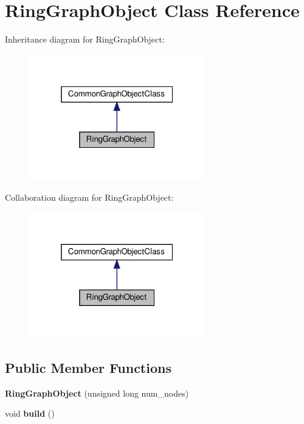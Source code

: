 \hypertarget{classRingGraphObject}{}\section{Ring\+Graph\+Object Class Reference}
\label{classRingGraphObject}


Inheritance diagram for Ring\+Graph\+Object\+:
\nopagebreak
\begin{figure}[H]
\begin{center}
\leavevmode
\includegraphics[width=217pt]{classRingGraphObject__inherit__graph}
\end{center}
\end{figure}


Collaboration diagram for Ring\+Graph\+Object\+:
\nopagebreak
\begin{figure}[H]
\begin{center}
\leavevmode
\includegraphics[width=217pt]{classRingGraphObject__coll__graph}
\end{center}
\end{figure}
\subsection*{Public Member Functions}
\begin{DoxyCompactItemize}
\item 
\mbox{\label{classRingGraphObject_aa9444a05e454bc4a21564be5ad1b61bf}} 
{\bfseries Ring\+Graph\+Object} (unsigned long num\+\_\+nodes)
\item 
\mbox{\label{classRingGraphObject_a9416e0dbcb70a77b9ef58beec72a053e}} 
void {\bfseries build} ()
\end{DoxyCompactItemize}
